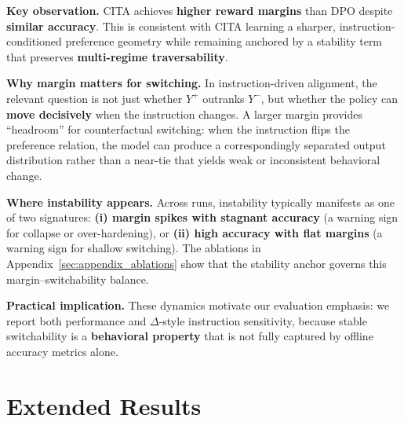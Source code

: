 \vspace{-0.2em}
\noindent\textbf{Key observation.}
\textsc{CITA} achieves \textbf{higher reward margins} than DPO despite \textbf{similar accuracy}.
This is consistent with \textsc{CITA} learning a sharper, instruction-conditioned preference geometry while remaining anchored by a stability term that preserves \textbf{multi-regime traversability}.

\vspace{-0.2em}
\noindent\textbf{Why margin matters for switching.}
In instruction-driven alignment, the relevant question is not just whether $Y^+$ outranks $Y^-$, but whether the policy can \textbf{move decisively} when the instruction changes.
A larger margin provides ``headroom'' for counterfactual switching:
when the instruction flips the preference relation, the model can produce a correspondingly separated output distribution rather than a near-tie that yields weak or inconsistent behavioral change.

\vspace{-0.2em}
\noindent\textbf{Where instability appears.}
Across runs, instability typically manifests as one of two signatures:
\textbf{(i) margin spikes with stagnant accuracy} (a warning sign for collapse or over-hardening), or
\textbf{(ii) high accuracy with flat margins} (a warning sign for shallow switching).
The ablations in Appendix~\ref{sec:appendix_ablations} show that the stability anchor governs this margin--switchability balance.

\vspace{-0.2em}
\noindent\textbf{Practical implication.}
These dynamics motivate our evaluation emphasis:
we report both performance and $\Delta$-style instruction sensitivity, because stable switchability is a \textbf{behavioral property} that is not fully captured by offline accuracy metrics alone.













\clearpage
\newpage


\vspace{-2mm}
\section{Extended Results}
\label{sec:appendix_extended_results}


